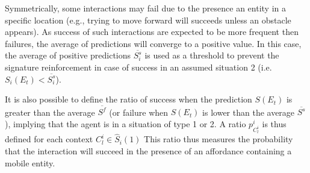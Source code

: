 \documentclass[conference]{IEEEtran}
\begin{document}
Symmetrically, some interactions may fail due to the presence an entity in a specific location (e.g., trying to move forward will succeeds unless an obstacle appears).
As success of such interactions are expected to be more frequent then failures, the average of predictions will converge to a positive value. 
In this case, the average of positive predictions $\overline{S_i^s}$ is used as a threshold to prevent the signature reinforcement in case of success in an assumed situation 2 (i.e. $S_i(E_t)<\overline{S_i^s}$).



It is also possible to define the ratio of success when the prediction $S(E_t)$ is greater than the average $\overline{S^f}$ (or failure when $S(E_t)$ is lower than the average $\overline{S^s}$), implying that the agent is in a situation of type 1 or 2. A ratio $p_{C_l^i}^i$ is thus defined for each context $C_l^i \in \hat{S}_i(1)$
This ratio thus measures the probability that the interaction will succeed in the presence of an affordance containing a mobile entity.








\end{document}
